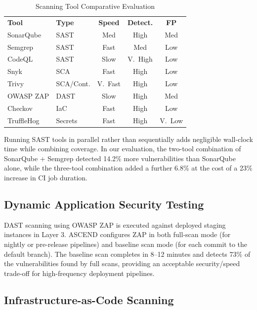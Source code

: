 \documentclass[journal]{IEEEtran}
\begin{document}
\begin{table}[h]
\centering
\caption{Scanning Tool Comparative Evaluation}
\label{tab:tools}
\scriptsize
\begin{tabular}{@{}llccc@{}}
\rowcolor{TableHeader}\color{white}\textbf{Tool} & \color{white}\textbf{Type} & \color{white}\textbf{Speed} & \color{white}\textbf{Detect.} & \color{white}\textbf{FP} \\
\rowcolor{IEEELightBlue}SonarQube & SAST & Med & High & Med \\
\rowcolor{TableAlt}Semgrep & SAST & Fast & Med & Low \\
\rowcolor{IEEELightBlue}CodeQL & SAST & Slow & V.~High & Low \\
\rowcolor{TableAlt}Snyk & SCA & Fast & High & Low \\
\rowcolor{IEEELightBlue}Trivy & SCA/Cont. & V.~Fast & High & Low \\
\rowcolor{TableAlt}OWASP ZAP & DAST & Slow & High & Med \\
\rowcolor{IEEELightBlue}Checkov & IaC & Fast & High & Low \\
\rowcolor{TableAlt}TruffleHog & Secrets & Fast & High & V.~Low \\
\end{tabular}
\end{table}

Running SAST tools in parallel rather than sequentially adds negligible wall-clock time while combining coverage. In our evaluation, the two-tool combination of SonarQube + Semgrep detected 14.2\% more vulnerabilities than SonarQube alone, while the three-tool combination added a further 6.8\% at the cost of a 23\% increase in CI job duration.

\subsection{Dynamic Application Security Testing}

DAST scanning using OWASP ZAP is executed against deployed staging instances in Layer 3. ASCEND configures ZAP in both full-scan mode (for nightly or pre-release pipelines) and baseline scan mode (for each commit to the default branch). The baseline scan completes in 8--12 minutes and detects 73\% of the vulnerabilities found by full scans, providing an acceptable security/speed trade-off for high-frequency deployment pipelines.

\subsection{Infrastructure-as-Code Scanning}
\end{document}

